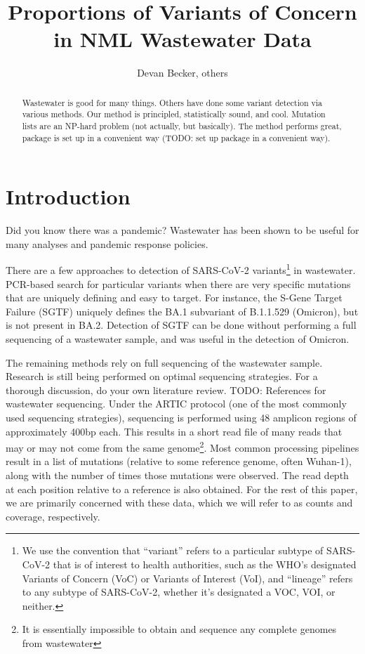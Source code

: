 \documentclass{article}
\title{Proportions of Variants of Concern in NML Wastewater Data}
\author{Devan Becker, others}
\date{}
\begin{document}
\maketitle

\begin{abstract}
Wastewater is good for many things.
Others have done some variant detection via various methods.
Our method is principled, statistically sound, and cool.
Mutation lists are an NP-hard problem (not actually, but basically).
The method performs great, package is set up in a convenient way (TODO: set up package in a convenient way).
\end{abstract}

\section{Introduction}

Did you know there was a pandemic?
Wastewater has been shown to be useful for many analyses and pandemic response policies.

There are a few approaches to detection of SARS-CoV-2 variants\footnote{We use the convention that ``variant'' refers to a particular subtype of SARS-CoV-2 that is of interest to health authorities, such as the WHO's designated Variants of Concern (VoC) or Variants of Interest (VoI), and ``lineage'' refers to any subtype of SARS-CoV-2, whether it's designated a VOC, VOI, or neither.} in wastewater.
PCR-based search for particular variants when there are very specific mutations that are uniquely defining and easy to target.
For instance, the S-Gene Target Failure (SGTF) uniquely defines the BA.1 subvariant of B.1.1.529 (Omicron), but is not present in BA.2.
Detection of SGTF can be done without performing a full sequencing of a wastewater sample, and was useful in the detection of Omicron.

The remaining methods rely on full sequencing of the wastewater sample.
Research is still being performed on optimal sequencing strategies.
For a thorough discussion, do your own literature review. TODO: References for wastewater sequencing.
Under the ARTIC protocol (one of the most commonly used sequencing strategies), sequencing is performed using 48 amplicon regions of approximately 400bp each.
This results in a short read file of many reads that may or may not come from the same genome\footnote{It is essentially impossible to obtain and sequence any complete genomes from wastewater}.
Most common processing pipelines result in a list of mutations (relative to some reference genome, often Wuhan-1), along with the number of times those mutations were observed.
The read depth at each position relative to a reference is also obtained.
For the rest of this paper, we are primarily concerned with these data, which we will refer to as counts and coverage, respectively.
\end{document}
